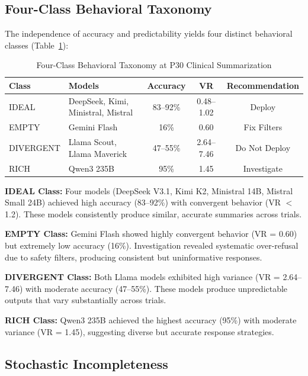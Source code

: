 \documentclass[11pt]{article}
\begin{document}
\subsection{Four-Class Behavioral Taxonomy}

The independence of accuracy and predictability yields four distinct behavioral classes (Table~\ref{tab:taxonomy}):

\begin{table}[htbp]
\centering
\caption{Four-Class Behavioral Taxonomy at P30 Clinical Summarization}
\label{tab:taxonomy}
\begin{tabular}{llccc}
\toprule
\textbf{Class} & \textbf{Models} & \textbf{Accuracy} & \textbf{VR} & \textbf{Recommendation} \\
\midrule
IDEAL & DeepSeek, Kimi, Ministral, Mistral & 83--92\% & 0.48--1.02 & Deploy \\
EMPTY & Gemini Flash & 16\% & 0.60 & Fix Filters \\
DIVERGENT & Llama Scout, Llama Maverick & 47--55\% & 2.64--7.46 & Do Not Deploy \\
RICH & Qwen3 235B & 95\% & 1.45 & Investigate \\
\bottomrule
\end{tabular}
\end{table}

\textbf{IDEAL Class:} Four models (DeepSeek V3.1, Kimi K2, Ministral 14B, Mistral Small 24B) achieved high accuracy (83--92\%) with convergent behavior (VR $<$ 1.2). These models consistently produce similar, accurate summaries across trials.

\textbf{EMPTY Class:} Gemini Flash showed highly convergent behavior (VR = 0.60) but extremely low accuracy (16\%). Investigation revealed systematic over-refusal due to safety filters, producing consistent but uninformative responses.

\textbf{DIVERGENT Class:} Both Llama models exhibited high variance (VR = 2.64--7.46) with moderate accuracy (47--55\%). These models produce unpredictable outputs that vary substantially across trials.

\textbf{RICH Class:} Qwen3 235B achieved the highest accuracy (95\%) with moderate variance (VR = 1.45), suggesting diverse but accurate response strategies.

\subsection{Stochastic Incompleteness}
\end{document}

